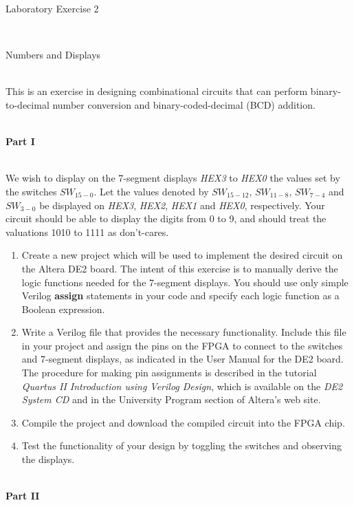 \documentclass[psfig,10pt,fullpage]{article}
\begin{document}
\centerline{\huge Laboratory Exercise 2}
~\\
\centerline{\large Numbers and Displays}
~\\

This is an exercise in designing combinational circuits that can perform
binary-to-decimal number conversion and binary-coded-decimal (BCD) addition.

~\\
\noindent
{\bf Part I}

~\\
\noindent
We wish to display on the 7-segment displays {\it HEX3} to {\it HEX0} the 
values set by the switches $SW_{15-0}$. 
Let the values denoted by $SW_{15-12}$, $SW_{11-8}$, $SW_{7-4}$ and 
$SW_{3-0}$ be displayed on {\it HEX3}, {\it HEX2}, {\it HEX1} and {\it HEX0}, respectively.
Your circuit should be able to display the digits from 0 to 9, and should treat the
valuations 1010 to 1111 as don't-cares.
\begin{enumerate}
\item Create a new project which will be used to implement the desired
circuit on the Altera DE2 board. The intent of this exercise is to manually 
derive the logic functions needed for the 7-segment displays. You should use only
simple Verilog {\bf assign} statements in your code and specify each logic function as
a Boolean expression.
\item Write a Verilog file that provides the necessary functionality. Include this 
file in your project and assign the pins on the FPGA to connect to the 
switches and 7-segment displays, as indicated in the User Manual for the DE2 board.
The procedure for making pin assignments is described in the 
tutorial {\it Quartus II Introduction using Verilog Design}, which is available 
on the {\it DE2 System CD} and in the University Program section of Altera's web site.  
\item Compile the project and download the compiled circuit into the FPGA
chip.
\item Test the functionality of your design by toggling the switches
and observing the displays.
\end{enumerate}

~\\
\noindent
{\bf Part II}
\end{document}
